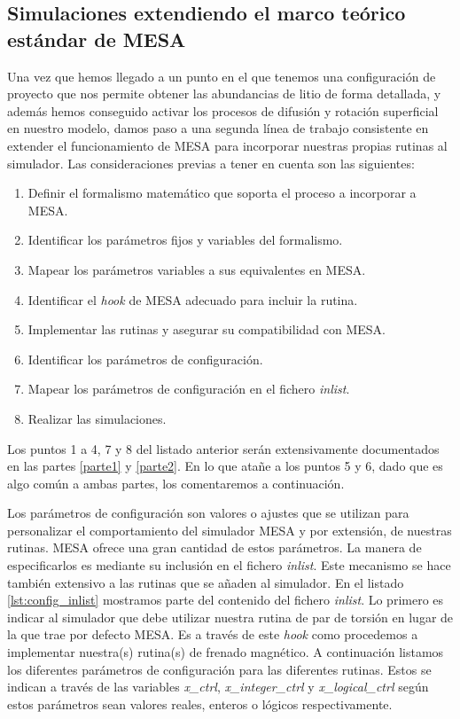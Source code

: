 \subsection{Simulaciones extendiendo el marco teórico estándar de MESA}
Una vez que hemos llegado a un punto en el que tenemos una configuración de proyecto que nos permite obtener las abundancias de litio de forma detallada, y además hemos conseguido activar los procesos de difusión y rotación superficial en nuestro modelo, damos paso a una segunda línea de trabajo consistente en extender el funcionamiento de MESA para incorporar nuestras propias rutinas al simulador. Las consideraciones previas a tener en cuenta son las siguientes:

\begin{enumerate}
	\item Definir el formalismo matemático que soporta el proceso a incorporar a MESA.
	\item Identificar los parámetros fijos y variables del formalismo.
	\item Mapear los parámetros variables a sus equivalentes en MESA.
	\item Identificar el \textit{hook} de MESA adecuado para incluir la rutina.
	\item Implementar las rutinas y asegurar su compatibilidad con MESA.
	\item Identificar los parámetros de configuración.
	\item Mapear los parámetros de configuración en el fichero \textit{inlist}.
	\item Realizar las simulaciones.
\end{enumerate}

Los puntos 1 a 4, 7 y 8 del listado anterior serán extensivamente documentados en las partes \ref{parte1} y \ref{parte2}. En lo que atañe a los puntos 5 y 6, dado que es algo común a ambas partes, los comentaremos a continuación.\par

Los parámetros de configuración son valores o ajustes que se utilizan para personalizar el comportamiento del simulador MESA y por extensión, de nuestras rutinas. MESA ofrece una gran cantidad de estos parámetros. La manera de especificarlos es mediante su inclusión en el fichero \textit{inlist}. Este mecanismo se hace también extensivo a las rutinas que se añaden al simulador. En el listado \ref{lst:config_inlist} mostramos parte del contenido del fichero \textit{inlist}. Lo primero es indicar al simulador que debe utilizar nuestra rutina de par de torsión en lugar de la que trae por defecto MESA. Es a través de este \textit{hook} como procedemos a implementar nuestra(s) rutina(s) de frenado magnético. A continuación listamos los diferentes parámetros de configuración para las diferentes rutinas. Estos se indican a través de las variables \textit{x\_ctrl}, \textit{x\_integer\_ctrl} y \textit{x\_logical\_ctrl} según estos parámetros sean valores reales, enteros o lógicos respectivamente.\par 

